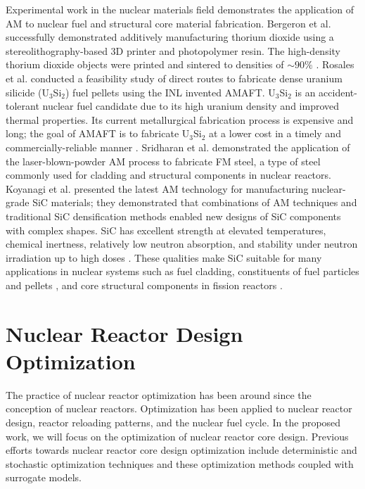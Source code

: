 Experimental work in the nuclear materials field demonstrates the application 
of \gls{AM} to nuclear fuel and structural core material fabrication. 
Bergeron et al. \cite{bergeron_early_2018} successfully demonstrated additively 
manufacturing thorium dioxide using a stereolithography-based 3D printer 
and photopolymer resin. 
The high-density thorium dioxide objects were printed and sintered to densities 
of $\sim90\%$ \cite{bergeron_early_2018}. 
Rosales et al. \cite{rosales_characterizing_2019} conducted a feasibility study 
of direct routes to fabricate dense uranium silicide (U$_3$Si$_2$) fuel pellets 
using the \gls{INL} invented \gls{AMAFT}. 
U$_3$Si$_2$ is an accident-tolerant nuclear fuel candidate due to its
high uranium density and improved thermal properties. 
Its current metallurgical fabrication process is expensive and long; the goal of
\gls{AMAFT} is to fabricate U$_3$Si$_2$ at a lower cost in a timely and
commercially-reliable manner \cite{rosales_characterizing_2019}.  
Sridharan et al. \cite{sridharan_performance_2019} demonstrated the application of
the laser-blown-powder \gls{AM} process to fabricate \gls{FM} steel, a type of 
steel commonly used for cladding and structural components in nuclear reactors. 
Koyanagi et al. \cite{koyanagi_additive_2020} presented the latest 
\gls{AM} technology for manufacturing nuclear-grade \gls{SiC} materials; they 
demonstrated that combinations of \gls{AM} techniques and traditional \gls{SiC} 
densification methods enabled new designs of \gls{SiC} components with complex shapes. 
\gls{SiC} has excellent strength at elevated temperatures, chemical inertness, 
relatively low neutron absorption, and stability under neutron irradiation up 
to high doses \cite{sauder_ceramic_2014, snead_handbook_2007,koyanagi_additive_2020}. 
These qualities make \gls{SiC} suitable for many applications in nuclear systems 
such as fuel cladding, constituents of fuel particles \cite{snead_handbook_2007} 
and pellets \cite{terrani_progress_2015}, and core structural components in fission 
reactors \cite{sauder_ceramic_2014}. 


\section{Nuclear Reactor Design Optimization}
\label{sec:opt}
The practice of nuclear reactor optimization has been around since the conception of 
nuclear reactors. 
Optimization has been applied to nuclear reactor design, reactor reloading 
patterns, and the nuclear fuel cycle.  
In the proposed work, we will focus on the optimization of nuclear reactor 
core design. 
Previous efforts towards nuclear reactor core design optimization include
deterministic and stochastic optimization techniques and these optimization 
methods coupled with surrogate models. 

